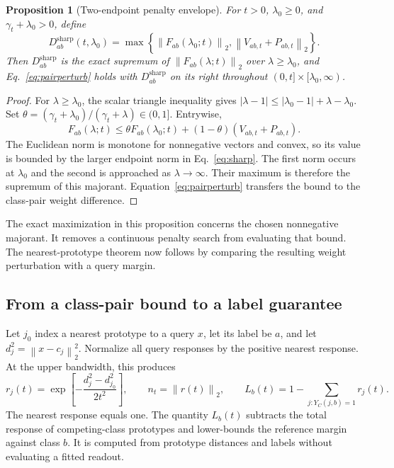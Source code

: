 \documentclass[preprint,12pt,authoryear]{elsarticle}
\newtheorem{proposition}{Proposition}
\newcommand{\norm}[1]{\left\lVert#1\right\rVert}
\newcommand{\sharpb}{\mathrm{sharp}}
\begin{document}
\begin{proposition}[Two-endpoint penalty envelope]
For $t>0$, $\lambda_0\geq0$, and $\gamma_t+\lambda_0>0$, define
\begin{equation}
 D^{\sharpb}_{ab}(t,\lambda_0)=
 \max\left\{\norm{F_{ab}(\lambda_0;t)}_2,
                  \norm{V_{ab,t}+P_{ab,t}}_2\right\}.
 \label{eq:sharp}
\end{equation}
Then $D^{\sharpb}_{ab}$ is the exact supremum of $\norm{F_{ab}(\lambda;t)}_2$ over $\lambda\geq\lambda_0$, and Eq.~\eqref{eq:pairperturb} holds with $D^{\sharpb}_{ab}$ on its right throughout $(0,t]\times[\lambda_0,\infty)$.
\end{proposition}
\begin{proof}
For $\lambda\geq\lambda_0$, the scalar triangle inequality gives
$|\lambda-1|\leq|\lambda_0-1|+\lambda-\lambda_0$. Set
$\theta=(\gamma_t+\lambda_0)/(\gamma_t+\lambda)\in(0,1]$. Entrywise,
\[
 F_{ab}(\lambda;t)
 \leq\theta F_{ab}(\lambda_0;t)
       +(1-\theta)(V_{ab,t}+P_{ab,t}).
\]
The Euclidean norm is monotone for nonnegative vectors and convex, so its value is bounded by the larger endpoint norm in Eq.~\eqref{eq:sharp}. The first norm occurs at $\lambda_0$ and the second is approached as $\lambda\to\infty$. Their maximum is therefore the supremum of this majorant. Equation~\eqref{eq:pairperturb} transfers the bound to the class-pair weight difference.
\end{proof}

The exact maximization in this proposition concerns the chosen nonnegative majorant. It removes a continuous penalty search from evaluating that bound. The nearest-prototype theorem now follows by comparing the resulting weight perturbation with a query margin.

\subsection{From a class-pair bound to a label guarantee}
Let $j_0$ index a nearest prototype to a query $x$, let its label be $a$, and let $d_j^2=\norm{x-c_j}_2^2$. Normalize all query responses by the positive nearest response. At the upper bandwidth, this produces
\begin{equation}
 r_j(t)=\exp\left[-\frac{d_j^2-d_{j_0}^2}{2t^2}\right],\qquad
 n_t=\norm{r(t)}_2,\qquad
 L_b(t)=1-\sum_{j:Y_C(j,b)=1}r_j(t).
 \label{eq:query}
\end{equation}
The nearest response equals one. The quantity $L_b(t)$ subtracts the total response of competing-class prototypes and lower-bounds the reference margin against class $b$. It is computed from prototype distances and labels without evaluating a fitted readout.
\end{document}
